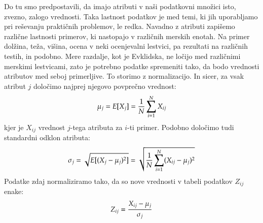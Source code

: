 Do tu smo predpostavili, da imajo atributi v naši podatkovni množici
isto, zvezno, zalogo vrednosti. Taka lastnost podatkov je med temi, ki
jih uporabljamo pri reševanju praktičnih problemov, le redka. Navadno
z atributi zapišemo različne lastnosti primerov, ki nastopajo v
različnih merskih enotah. Na primer dolžina, teža, višina, ocena v
neki ocenjevalni lestvici, pa rezultati na različnih testih, in
podobno. Mere razdalje, kot je Evklidska, ne ločijo med različnimi
merskimi lestvicami, zato je potrebno podatke spremeniti tako, da bodo
vrednosti atributov med seboj primerljive. To storimo z
normalizacijo. In sicer, za vsak atribut $j$ določimo najprej njegovo
povprečno vrednost:
%
$$ \mu_j=E[X_j]={1\over N}\sum_{i=1}^N X_{ij}$$
%
kjer je $X_{ij}$ vrednost $j$-tega atributa za $i$-ti primer. Podobno
določimo tudi standardni odklon atributa:
%
$$ \sigma_j=\sqrt{E[(X_j-\mu_j)^2]}=\sqrt{{1\over N} \sum_{i=1}^N
  (X_{ij}-\mu_j)^2}$$
Podatke zdaj normaliziramo tako, da so nove vrednosti v tabeli
podatkov $Z_{ij}$ enake:
$$ Z_{ij}={X_{ij}-\mu_j\over\sigma_j} $$
